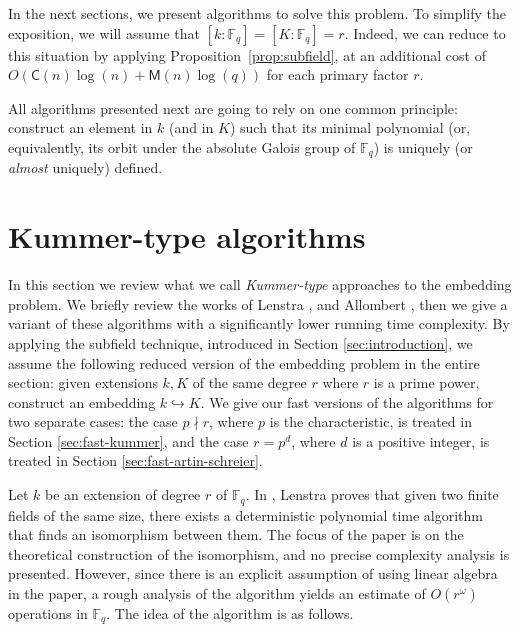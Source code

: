 \documentclass[12pt]{article}
\theoremstyle{plain}
\theoremstyle{definition}
\def\F{\ensuremath{\mathbb{F}}}
\def\MM{\ensuremath{\mathsf{M}}}
\def\CC{\ensuremath{\mathsf{C}}}
\newcounter{algorithm}
\begin{document}
In the next sections, we present algorithms to solve this problem. To
simplify the exposition, we will assume that $[k:\F_q]=[K:\F_q]=r$.
Indeed, we can reduce to this situation by applying
Proposition~\ref{prop:subfield}, at an additional cost of
$O(\CC(n)\log(n) + \MM(n)\log(q))$ for each primary factor $r$.

All algorithms presented next are going to rely on one common
principle: construct an element in $k$ (and in $K$) such that its
minimal polynomial (or, equivalently, its orbit under the absolute
Galois group of $\F_q$) is uniquely (or \emph{almost} uniquely)
defined.






\section{Kummer-type algorithms}
\label{sec:kummer}

In this section we review what we call \textit{Kummer-type} approaches to the embedding problem. 
We briefly review the works of Lenstra \cite{LenstraJr91}, and Allombert \cite{Allombert02}, then 
we give a variant of these algorithms with a significantly lower running time complexity. By 
applying the subfield technique, introduced in Section \ref{sec:introduction}, we assume the 
following reduced version of the embedding problem in the entire section: given extensions $k, K$  
of the same degree $r$ where $r$ is a prime power, construct an embedding $k \hookrightarrow K$. We 
give our fast versions of the algorithms for two separate cases: the case $p \nmid r$, where $p$ is 
the characteristic, is treated in Section \ref{sec:fast-kummer}, and the case $r = p^d$, where $d$ 
is a positive integer, is treated in Section \ref{sec:fast-artin-schreier}.

Let $k$ be an extension of degree $r$ of $\F_q$. In \cite{LenstraJr91}, Lenstra proves that 
given two finite fields of the same size, there exists a deterministic polynomial time algorithm 
that finds an isomorphism between them. The focus of the paper is on the theoretical construction 
of the isomorphism, and no precise complexity analysis is presented. However, since there is an 
explicit assumption of using linear algebra in the paper, a rough analysis of the algorithm yields 
an estimate of $O(r^{\omega})$ operations in $\F_q$. The idea of the algorithm is as follows.
\end{document}
